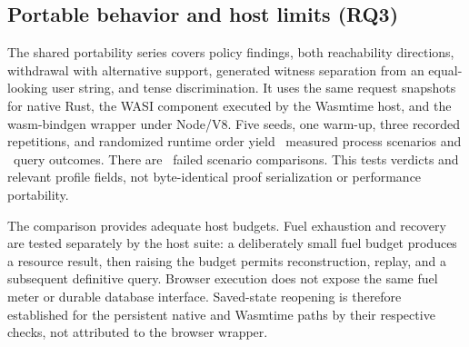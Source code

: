

\subsection{Portable behavior and host limits (RQ3)}

The shared portability series covers policy findings, both reachability
directions, withdrawal with alternative support, generated witness separation
from an equal-looking user string, and tense discrimination. It uses the same
request snapshots for native Rust, the WASI component executed by the Wasmtime
host, and the wasm-bindgen wrapper under Node/V8. Five seeds, one warm-up,
three recorded repetitions, and randomized runtime order yield
\PortableComparisons\ measured process scenarios and \PortableAnswers\
query outcomes. There are \PortableFailures\ failed scenario comparisons.
This tests verdicts and relevant profile fields, not byte-identical proof
serialization or performance portability.

The comparison provides adequate host budgets. Fuel exhaustion and recovery
are tested separately by the host suite: a deliberately small fuel budget
produces a resource result, then raising the budget permits reconstruction,
replay, and a subsequent definitive query. Browser execution does not expose
the same fuel meter or durable database interface. Saved-state reopening is
therefore established for the persistent native and Wasmtime paths by their
respective checks, not attributed to the browser wrapper.
